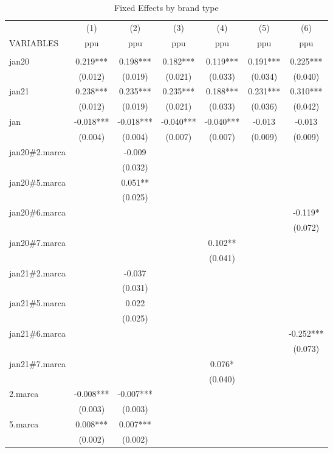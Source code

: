 \begin{longtable}{lcccccc} 
	\caption{Fixed Effects by brand type}\label{tab:2}\\	
	\hline
 & (1) & (2) & (3) & (4) & (5) & (6) \\
VARIABLES & ppu & ppu & ppu & ppu & ppu & ppu \\ \hline
 &  &  &  &  &  &  \\
jan20 & 0.219*** & 0.198*** & 0.182*** & 0.119*** & 0.191*** & 0.225*** \\
& (0.012) & (0.019) & (0.021) & (0.033) & (0.034) & (0.040) \\
jan21 & 0.238*** & 0.235*** & 0.235*** & 0.188*** & 0.231*** & 0.310*** \\
& (0.012) & (0.019) & (0.021) & (0.033) & (0.036) & (0.042) \\
jan & -0.018*** & -0.018*** & -0.040*** & -0.040*** & -0.013 & -0.013 \\
& (0.004) & (0.004) & (0.007) & (0.007) & (0.009) & (0.009) \\
jan20\#2.marca &  & -0.009 &  &  &  &  \\
 &  & (0.032) &  &  &  &  \\
jan20\#5.marca &  & 0.051** &  &  &  &  \\
&  & (0.025) &  &  &  &  \\
jan20\#6.marca &  &  &  &  &  & -0.119* \\
&  &  &  &  &  & (0.072) \\
jan20\#7.marca &  &  &  & 0.102** &  &  \\
&  &  &  & (0.041) &  &  \\
jan21\#2.marca &  & -0.037 &  &  &  &  \\
 &  & (0.031) &  &  &  &  \\
jan21\#5.marca &  & 0.022 &  &  &  &  \\
 &  & (0.025) &  &  &  &  \\
jan21\#6.marca &  &  &  &  &  & -0.252*** \\
&  &  &  &  &  & (0.073) \\
jan21\#7.marca &  &  &  & 0.076* &  &  \\
&  &  &  & (0.040) &  &  \\
2.marca & -0.008*** & -0.007*** &  &  &  &  \\
& (0.003) & (0.003) &  &  &  &  \\
5.marca & 0.008*** & 0.007*** &  &  &  &  \\
& (0.002) & (0.002) &  &  &  &  \\

\end{longtable}
